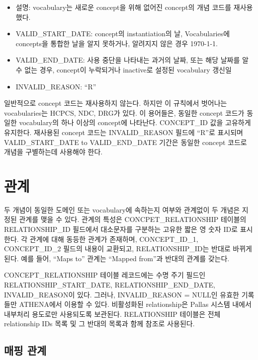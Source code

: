 \documentclass[11pt]{book}
\providecommand{\tightlist}{%
  \setlength{\itemsep}{0pt}\setlength{\parskip}{0pt}}
\theoremstyle{definition}
\theoremstyle{definition}
\theoremstyle{definition}
\theoremstyle{remark}
\begin{document}
\begin{itemize}
  \begin{itemize}
  \tightlist
  \item
    설명: vocabulary는 새로운 concept을 위해 없어진 concept의 개념
    코드를 재사용했다.
  \item
    VALID\_START\_DATE: concept의 instantiation의 날, Vocabularies에
    concepts을 통합한 날을 알지 못하거나, 알려지지 않은 경우 1970-1-1.
  \item
    VALID\_END\_DATE: 사용 중단을 나타내는 과거의 날짜, 또는 해당 날짜를
    알 수 없는 경우, concept이 누락되거나 inactive로 설정된 vocabulary
    갱신일
  \item
    INVALID\_REASON: ``R''
  \end{itemize}
\end{itemize}

일반적으로 concept 코드는 재사용하지 않는다. 하지만 이 규칙에서 벗어나는
vocabularies는 HCPCS, NDC, DRG가 있다. 이 용어들은, 동일한 concept
코드가 동일한 vocabulary의 하나 이상의 concept에 나타난다. CONCEPT\_ID
값을 고유하게 유지한다. 재사용된 concept 코드는 INVALID\_REASON 필드에
``R''로 표시되며 VALID\_START\_DATE to VALID\_END\_DATE 기간은 동일한
concept 코드로 개념을 구별하는데 사용해야 한다.

\section{관계}

두 개념이 동일한 도메인 또는 vocabulary에 속하는지 여부와 관계없이 두
개념은 지정된 관계를 맺을 수 있다. 관계의 특성은 CONCPET\_RELATIONSHIP
테이블의 RELATIONSHIP\_ID 필드에서 대소문자를 구분하는 고유한 짧은 영
숫자 ID로 표시한다. 각 관계에 대해 동등한 관계가 존재하며,
CONCEPT\_ID\_1, CONCEPT\_ID\_2 필드의 내용이 교환되고,
RELATIONSHIP\_ID는 반대로 바뀌게 된다. 예를 들어, ``Maps to'' 관계는
``Mapped from''과 반대의 관계를 갖는다. 

CONCEPT\_RELATIONSHIP 테이블 레코드에는 수명 주기 필드인
RELATIONSHIP\_START\_DATE, RELATIONSHIP\_END\_DATE, INVALID\_REASON이
있다. 그러나, INVALID\_REASON = NULL인 유효한 기록들만 ATHENA에서 이용할
수 있다. 비활성화된 relationship은 Pallas 시스템 내에서 내부처리
용도로만 사용되도록 보관된다. RELATIONSHIP 테이블은 전체 relationship
IDs 목록 및 그 반대의 목록과 함께 참조로 사용된다.

\subsection{매핑 관계}\label{conceptMapping}
\end{document}
